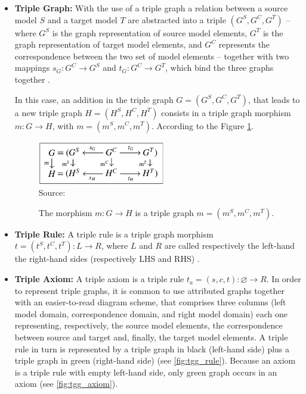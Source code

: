 \documentclass[tuberlin,cic,tc,english,noabntcite, oneside]{iiufrgs}
\begin{document}
\begin{itemize}
	\item \textbf{Triple Graph:} With the use of a triple graph a relation between a source model $S$ and a target model $T$ are abstracted into a triple $(G^S,G^C,G^T)$ – where $G^S$ is the graph representation of source model elements, $G^T$ is the graph representation of target model elements, and $G^C$ represents the correspondence between the two set of model elements – together with two mappings $s_G: G^C \rightarrow G^S$ and $t_G: G^C \rightarrow G^T$, which bind the three graphs together \citep{hermann2011correctness}.
	
	In this case, an addition in the triple graph $G = (G^S,G^C,G^T)$, that leads to a new triple graph $H = (H^S,H^C,H^T)$ consists in a triple graph morphism $m: G \rightarrow H$, with $m = (m^S,m^C,m^T)$. According to the Figure \ref{fig:tg_morphism}.

	\begin{figure}[h]
		\centering
	    \caption{The morphism $m: G \rightarrow H$ is a triple graph $m =  (m^S,m^C,m^T)$.}
	    \includegraphics[width=15em]{tg_morphism}\\
	    Source: \citep{hermann2011correctness}
	    \label{fig:tg_morphism}
	\end{figure}

	\item \textbf{Triple Rule:} A triple rule is a triple graph morphism $t = (t^S,t^C,t^T) : L \rightarrow R$, where $L$ and $R$ are called respectively the left-hand the right-hand sides (respectively LHS and RHS) \citep{ehrig2007information}.
		
	\item \textbf{Triple Axiom:} A triple axiom is a triple rule $t_a = (s, c, t) : \varnothing \rightarrow R$. In order to represent triple graphs, it is common to use attributed graphs together with an easier-to-read diagram scheme, that comprises three columns (left model domain, correspondence domain, and right model domain) each one representing, respectively, the source model elements, the correspondence between source and target and, finally, the target model elements. A triple rule in turn is represented by a triple graph in black (left-hand side) plus a triple graph in green (right-hand side) (see \ref{fig:tgg_rule}). Because an axiom is a triple rule with empty left-hand side, only green graph occurs in an axiom (see \ref{fig:tgg_axiom}).
	

\end{itemize}
\end{document}
